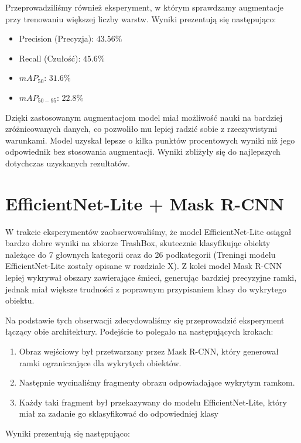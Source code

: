 \documentclass[licencjacka]{pracamgr}
\begin{document}
Przeprowadziliśmy również eksperyment, w którym sprawdzamy augmentacje przy trenowaniu większej liczby warstw. Wyniki prezentują się następująco:

\begin{itemize}
    \item Precision (Precyzja): $43.56\%$
    \item Recall (Czułość): $45.6\%$
    \item $mAP_{50}$: $31.6\%$
    \item $mAP_{50-95}$: $22.8\%$
\end{itemize}

Dzięki zastosowanym augmentacjom model miał możliwość nauki na bardziej zróżnicowanych danych, co pozwoliło mu lepiej radzić sobie z rzeczywistymi warunkami. Model uzyskał lepsze o kilka punktów procentowych wyniki niż jego odpowiednik bez stosowania augmentacji. Wyniki zbliżyły się do najlepszych dotychczas uzyskanych rezultatów.

\section{EfficientNet-Lite + Mask R-CNN}

W trakcie eksperymentów zaobserwowaliśmy, że model EfficientNet-Lite osiągał bardzo dobre wyniki na zbiorze TrashBox, skutecznie klasyfikując obiekty należące do 7 głownych kategorii oraz do 26 podkategorii (Treningi modelu EfficientNet-Lite zostały opisane w rozdziale X). Z kolei model Mask R-CNN lepiej wykrywał obszary zawierające śmieci, generując bardziej precyzyjne ramki, jednak miał większe trudności z poprawnym przypisaniem klasy do wykrytego obiektu.  

Na podstawie tych obserwacji zdecydowaliśmy się przeprowadzić eksperyment łączący obie architektury. Podejście to polegało na następujących krokach:
\begin{enumerate}
    \item Obraz wejściowy był przetwarzany przez Mask R-CNN, który generował ramki ograniczające dla wykrytych obiektów.
    \item Następnie wycinaliśmy fragmenty obrazu odpowiadające wykrytym ramkom.
    \item Każdy taki fragment był przekazywany do modelu EfficientNet-Lite, który miał za zadanie go sklasyfikować do odpowiedniej klasy
\end{enumerate}

Wyniki prezentują się następująco:
\end{document}
